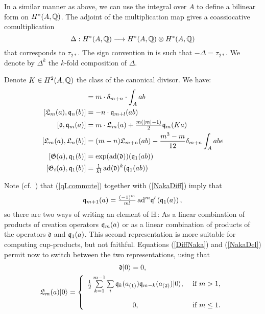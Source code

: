\begin{remark}
In a similar manner as above, we can use the integral over $A$ to define a bilinear form on $H^*(A,\mathbb{Q})$. The adjoint of the multiplication map gives a coassiocative comultiplication
$$
\Delta : H^*(A,\mathbb{Q}) \longrightarrow H^*(A,\mathbb{Q})\otimes H^*(A,\mathbb{Q})
$$
that corresponds to $\tau_{2*}$. The sign convention in \cite{LehnSorger} is such that $-\Delta =  \tau_{2*}$. We denote by $\Delta^k$ the $k$-fold composition of $\Delta$.
\end{remark}
\begin{lemma}\cite[Thm.~2.16]{LiQinWang} Denote $K\in H^2(A,\mathbb{Q})$ the class of the canonical divisor. We have:
\begin{align}
[\q_m(a), \q_n(b)] &= m\cdot \delta_{m+n} \cdot \int_A ab \\
\label{qLcommute}
[\mathfrak{L}_m(a),\q_n(b)] &= -n\cdot \q_{m+l}(ab) \\
\label{DiffNaka}
[\mathfrak{d},\q_m(a)] &= m \cdot \mathfrak{L}_m(a) + \tfrac{m(|m|-1)}{2} \q_m(K a) \\
[\mathfrak{L}_m(a),\mathfrak{L}_n(b)] &= (m-n) \mathfrak{L}_{m+n}(ab) - \frac{m^3-m}{12} \delta_{m+n}\int_A abe \\
[\G(a),\q_1(b)] &= \exp(\ad(\mathfrak{d}))(\q_1(a b) ) \\
[\G_i(a),\q_1(b)] &= \tfrac{1}{k!} \ad(\mathfrak{d})^k(\q_1(a b) ) 
\end{align}
\end{lemma}
\begin{remark}\label{HRep}
Note (cf.~\cite[Thm.~3.8]{LehnSorger}) that (\ref{qLcommute}) together with (\ref{NakaDiff}) imply that 
\begin{equation}\label{NakaDel}
\mathfrak{q}_{m+1}(a) = \tfrac{(-1)^m}{m!}\operatorname{ad}^m\!\mathfrak{q}'\left(\mathfrak{q}_1(a)\right),
\end{equation}
so there are two ways of writing an element of $\mathbb{H}$: As a linear combination of products of creation operators $\mathfrak{q}_m(a)$ or as a linear combination of products of the operators $\mathfrak{d}$ and $\mathfrak{q}_1(a)$. This second representation is more suitable for computing cup-products, but not faithful. 
Equations (\ref{DiffNaka}) and (\ref{NakaDel}) permit now to switch between the two representations, using that
\begin{gather}
\mathfrak{d} \vac = 0 ,  \\
\mathfrak{L}_m(a) \vac = \left\{ 
\begin{array}{cl}
 \tfrac{1}{2}\sum\limits_{k=1}^{m-1}\sum\limits_{i}\q_k(a_{(1)})\q_{m-k}(a_{(2)})\vac, & \text{ if } m>1, \vspace{4mm}\\
 0, & \text{ if } m\leq 1. \\
\end{array}
\right.\\
\end{gather}
\end{remark}

